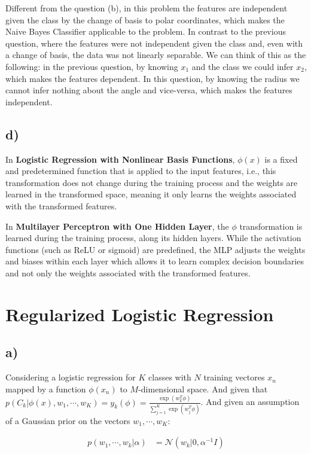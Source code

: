 \documentclass[12pt,a4paper,oneside]{paper}
\begin{document}
Different from the question (b), in this problem the features are independent given the class by
the change of basis to polar coordinates, which makes the Naive Bayes Classifier applicable to the problem. 
In contrast to the previous question, where the features were not independent given the class and, even with a change of basis,
the data was not linearly separable. We can think of this as the following: in the previous question, by knowing
$x_1$ and the class we could infer $x_2$, which makes the features dependent. In this question, by knowing the radius
we cannot infer nothing about the angle and vice-versa, which makes the features independent.

\subsection*{d)}

In \textbf{Logistic Regression with Nonlinear Basis Functions}, $\phi(x)$ is a fixed and predetermined function
that is applied to the input features, i.e., this transformation does not change during the training process
and the weights are learned in the transformed space, meaning it only learns the weights associated with the
transformed features.

In \textbf{Multilayer Perceptron with One Hidden Layer}, the $\phi$ transformation is learned during the training process,
along its hidden layers. While the activation functions (such as ReLU or sigmoid) are predefined,
the MLP adjusts the weights and biases within each layer which allows it to learn complex decision boundaries and not
only the weights associated with the transformed features.

\section{Regularized Logistic Regression}

\subsection{a)}

Considering a logistic regression for $K$ classes with $N$ training vectores $x_n$ mapped by a function $\phi(x_n)$ to $M$-dimensional space.
And given that $p(C_k | \phi(x), w_1, \cdots, w_K) = y_k(\phi) = \frac{\exp(w_k^T \phi)}{\sum_{j=1}^{K} \exp(w_j^T \phi)}$.
And given an assumption of a Gaussian prior on the vectors $w_1, \cdots, w_K$:

\begin{align*}
    p(w_1, \cdots, w_k | \alpha) &= \mathcal{N}(w_k | 0, \alpha^{-1} I)
\end{align*}
\end{document}
